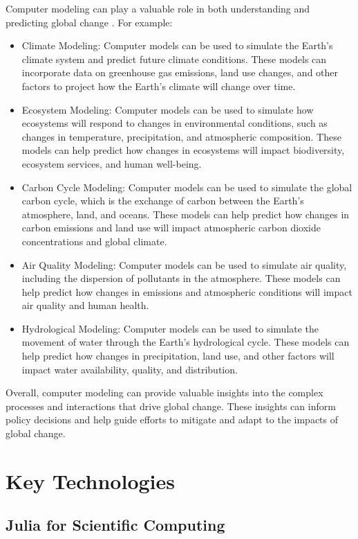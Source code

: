 Computer modeling can play a valuable role in both understanding and predicting global change \cite{Chen2019, Hantson2016, DeLucia2021, Oleson2013, Clark2016}. For example:
\begin{itemize}
\item Climate Modeling: Computer models can be used to simulate the Earth's climate system and predict future climate conditions. These models can incorporate data on greenhouse gas emissions, land use changes, and other factors to project how the Earth's climate will change over time.
\item Ecosystem Modeling: Computer models can be used to simulate how ecosystems will respond to changes in environmental conditions, such as changes in temperature, precipitation, and atmospheric composition. These models can help predict how changes in ecosystems will impact biodiversity, ecosystem services, and human well-being.
\item Carbon Cycle Modeling: Computer models can be used to simulate the global carbon cycle, which is the exchange of carbon between the Earth's atmosphere, land, and oceans. These models can help predict how changes in carbon emissions and land use will impact atmospheric carbon dioxide concentrations and global climate.
\item Air Quality Modeling: Computer models can be used to simulate air quality, including the dispersion of pollutants in the atmosphere. These models can help predict how changes in emissions and atmospheric conditions will impact air quality and human health.
\item Hydrological Modeling: Computer models can be used to simulate the movement of water through the Earth's hydrological cycle. These models can help predict how changes in precipitation, land use, and other factors will impact water availability, quality, and distribution.
\end{itemize}

Overall, computer modeling can provide valuable insights into the complex processes and interactions that drive global change. These insights can inform policy decisions and help guide efforts to mitigate and adapt to the impacts of global change.


\section{Key Technologies}


\subsection{Julia for Scientific Computing}

